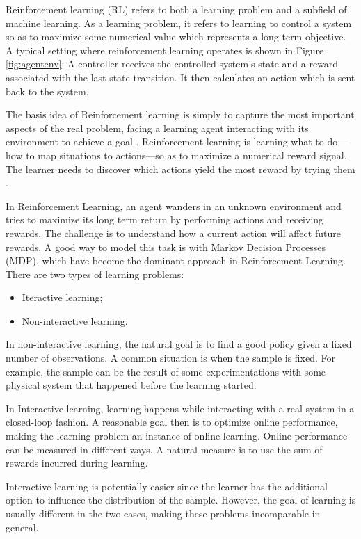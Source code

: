 \documentclass{bmcart}
\begin{document}
Reinforcement learning (RL) refers to both a learning problem and a subfield of machine
learning. As a learning problem, it refers to learning to control a system so as to maximize
some numerical value which represents a long-term objective. A typical setting where
reinforcement learning operates is shown in Figure \ref{fig:agentenv}: A controller receives the controlled
system’s state and a reward associated with the last state transition. It then calculates an
action which is sent back to the system.





The basis idea of Reinforcement learning  is simply to capture the most important aspects of the real problem, facing a learning agent interacting with its environment to achieve a goal \citep{Sutton2012}. Reinforcement learning is learning what to do—how to map situations to actions—so as to maximize a numerical reward signal. The learner needs to discover which actions yield the most reward by trying them \citep{Sutton2012}.

In Reinforcement Learning, an agent wanders in an unknown environment and tries to maximize its long term return by performing actions and receiving rewards. The challenge is to understand how a current action will affect future rewards. A good way to model this task is with Markov Decision Processes (MDP), which have become the dominant approach in Reinforcement Learning. There are two types of learning problems:

\begin{itemize}
\item Iteractive learning;
\item Non-interactive learning.
\end{itemize}

In non-interactive learning, the natural goal is to find a good policy given a fixed number of observations. A common situation is when the sample is fixed. For example, the sample can be the result of some experimentations with some physical system that happened before the learning started. 

In Interactive learning, learning happens while interacting with a real system in a closed-loop fashion. A reasonable goal then is to optimize online performance,
making the learning problem an instance of online learning. Online performance can be measured in different ways. A natural measure is to use the sum of rewards incurred during learning. 

Interactive learning is potentially easier since the learner has the additional option to influence the distribution of the sample. However, the goal of
learning is usually different in the two cases, making these problems incomparable in general.
\end{document}
